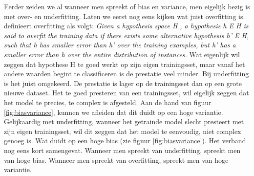 Eerder zeiden we al wanneer men spreekt of bias en variance, men eigelijk bezig is met over- en underfitting. Laten we eerst nog eens kijken wat juist overfitting is. \citet{mitchell1997machine} definieert overfitting als volgt:
\newline
\newline
\textit{Given a hypothesis space H , a hypothesis h E H is said to overfit the training data if there exists some alternative hypothesis h' E H, such that h has smaller error than h' over the training examples, but h' has a smaller error than h over the entire distribution of instances.}
\newline
\newline
Wat eigenlijk wil zeggen dat hypothese H te goed werkt op zijn eigen trainingsset, maar vanaf het andere waarden begint te classificeren is de prestatie veel minder. Bij underfitting is het juist omgekeerd. De prestatie is lager op de trainingsset dan op een grote nieuwe dataset. Het te goed presteren van een trainingsset, wil eigelijk zeggen dat het model te precies, te complex is afgesteld. Aan de hand van figuur \ref{fig:biasvariance}, kunnen we afleiden dat dit duidt op een hoge variantie. Gelijkaardig met underfitting, wanneer het getrainde model slecht presteert met zijn eigen trainingsset, wil dit zeggen dat het model te eenvoudig, niet complex genoeg is. Wat duidt op een hoge bias (zie figuur \ref{fig:biasvariance}).
%
Het verband nog eens kort samengevat. Wanneer men spreekt van underfitting, spreekt men van hoge bias. Wanneer men spreekt van overfitting, spreekt men van hoge variantie.
